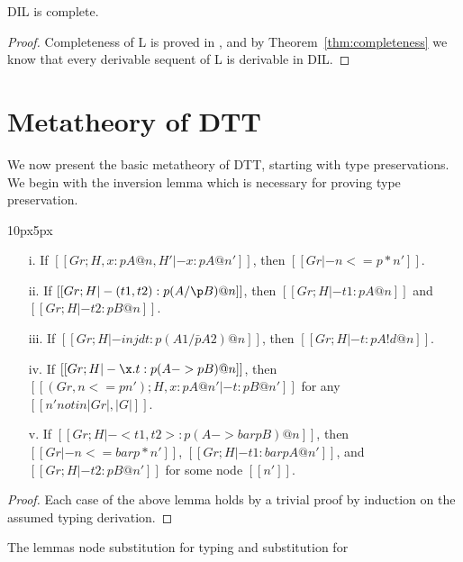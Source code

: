 \begin{corollary}[Completeness]
  \label{corollary:completeness}
  DIL is complete.
\end{corollary}
\begin{proof}
  Completeness of L is proved in \cite{Pinto:2009}, and by Theorem~\ref{thm:completeness} we know that
  every derivable sequent of L is derivable in DIL.
\end{proof}

\section{Metatheory of DTT}
\label{sec:dualized_type_theory}
We now present the basic metatheory of DTT, starting with type
preservations. We begin with the inversion lemma which is necessary
for proving type preservation.
\begin{lemma}[Inverstion]
  \label{lemma:inverstion}
  \vspace{-30px}
  \begin{changemargin}{10px}{5px}\noindent
  \begin{itemize}
  \item[i.] If $[[Gr;H, x : p A @ n, H' |- x : p A @ n']]$, then 
    $[[Gr |- n <=p* n']]$.
  \item[ii.] If $[[Gr;H |- (t1,t2) : p (A /\p B) @ n]]$, then 
    $[[Gr;H |- t1 : p A @ n]]$ and $[[Gr;H |- t2 : p B @ n]]$.
  \item[iii.] If $[[Gr;H |- inj d t : p (A1 /\bar p A2) @ n]]$, then 
    $[[Gr;H |- t : p A!d @ n]]$.
  \item[iv.] If $[[Gr;H |- \x.t : p (A ->p B)@n]]$, then 
    $[[(Gr, n <=p n');H,x : p A @ n' |- t : p B @ n']]$ for any
    $[[n' notin |Gr|,|G|]]$.
  \item[v.] If $[[Gr;H |- <t1,t2> : p (A ->bar p B) @ n]]$, then
    $[[Gr |- n <=bar p * n']]$, $[[Gr;H |- t1 : bar p A @ n']]$, and
    $[[Gr;H |- t2 : p B @ n']]$ for some node $[[n']]$.
  \end{itemize}
  \end{changemargin}
\end{lemma}
\begin{proof}
  Each case of the above lemma holds by a trivial proof by induction
  on the assumed typing derivation.
\end{proof}
\noindent The lemmas node substitution for typing and substitution for
